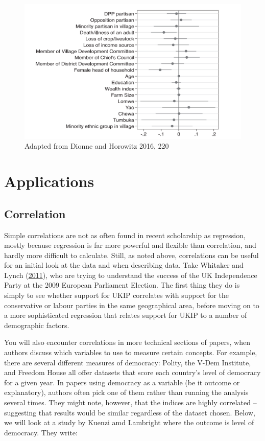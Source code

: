 \documentclass{book}
\begin{document}
\begin{figure}
\hypertarget{fig:dotwhisker}{%
\centering
\includegraphics{images/largen/dotwhisker.png}
\caption{Adapted from Dionne and Horowitz 2016, 220}\label{fig:dotwhisker}
}
\end{figure}

\hypertarget{applications-2}{%
\section{Applications}\label{applications-2}}

\hypertarget{correlation-1}{%
\subsection{Correlation}\label{correlation-1}}

Simple correlations are not as often found in recent scholarship as
regression, mostly because regression is far more powerful and flexible than
correlation, and hardly more difficult to calculate. Still, as noted above,
correlations can be useful for an initial look at the data and when describing
data. Take Whitaker and Lynch
(\protect\hyperlink{ref-whitaker2011explaining}{2011}), who are trying to
understand the success of the UK Independence Party at the 2009 European
Parliament Election. The first thing they do is simply to see whether support
for UKIP correlates with support for the conservative or labour parties in the
same geographical area, before moving on to a more sophisticated regression
that relates support for UKIP to a number of demographic factors.

You will also encounter correlations in more technical sections of papers,
when authors discuss which variables to use to measure certain concepts. For
example, there are several different measures of democracy: Polity, the V-Dem
Institute, and Freedom House all offer datasets that score each country's
level of democracy for a given year. In papers using democracy as a variable
(be it outcome or explanatory), authors often pick one of them rather than
running the analysis several times. They might note, however, that the indices
are highly correlated -- suggesting that results would be similar regardless
of the dataset chosen. Below, we will look at a study by Kuenzi amd Lambright
where the outcome is level of democracy. They write:
\end{document}
